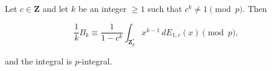 Let $c \in \mathbf{Z}$ and let $k$ be an integer $\geq 1$ such that $c^k \neq 1 \pmod{p}$. Then

$$\frac{1}{k} B_k \equiv \frac{1}{1 - c^k} \int_{\mathbf{Z}_p^*} x^{k-1} \, dE_{1,c}(x) \pmod{p},$$

and the integral is $p$-integral.

